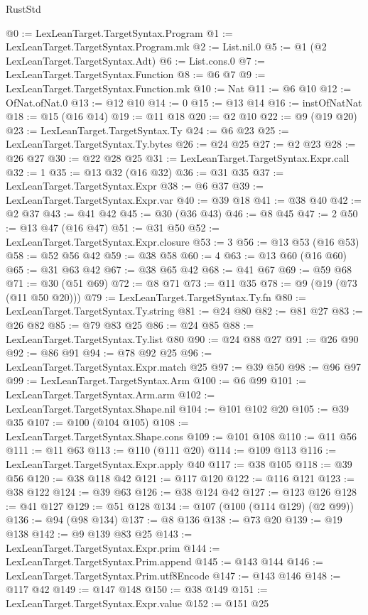 \begin{lexlean}{RustStd}
\begin{coremodule}
@0 := LexLeanTarget.TargetSyntax.Program
@1 := LexLeanTarget.TargetSyntax.Program.mk
@2 := List.nil.{0}
@5 := @1 (@2 LexLeanTarget.TargetSyntax.Adt)
@6 := List.cons.{0}
@7 := LexLeanTarget.TargetSyntax.Function
@8 := @6 @7
@9 := LexLeanTarget.TargetSyntax.Function.mk
@10 := Nat
@11 := @6 @10
@12 := OfNat.ofNat.{0}
@13 := @12 @10
@14 := 0
@15 := @13 @14
@16 := instOfNatNat
@18 := @15 (@16 @14)
@19 := @11 @18
@20 := @2 @10
@22 := @9 (@19 @20)
@23 := LexLeanTarget.TargetSyntax.Ty
@24 := @6 @23
@25 := LexLeanTarget.TargetSyntax.Ty.bytes
@26 := @24 @25
@27 := @2 @23
@28 := @26 @27
@30 := @22 @28 @25
@31 := LexLeanTarget.TargetSyntax.Expr.call
@32 := 1
@35 := @13 @32 (@16 @32)
@36 := @31 @35
@37 := LexLeanTarget.TargetSyntax.Expr
@38 := @6 @37
@39 := LexLeanTarget.TargetSyntax.Expr.var
@40 := @39 @18
@41 := @38 @40
@42 := @2 @37
@43 := @41 @42
@45 := @30 (@36 @43)
@46 := @8 @45
@47 := 2
@50 := @13 @47 (@16 @47)
@51 := @31 @50
@52 := LexLeanTarget.TargetSyntax.Expr.closure
@53 := 3
@56 := @13 @53 (@16 @53)
@58 := @52 @56 @42
@59 := @38 @58
@60 := 4
@63 := @13 @60 (@16 @60)
@65 := @31 @63 @42
@67 := @38 @65 @42
@68 := @41 @67
@69 := @59 @68
@71 := @30 (@51 @69)
@72 := @8 @71
@73 := @11 @35
@78 := @9 (@19 (@73 (@11 @50 @20)))
@79 := LexLeanTarget.TargetSyntax.Ty.fn
@80 := LexLeanTarget.TargetSyntax.Ty.string
@81 := @24 @80
@82 := @81 @27
@83 := @26 @82
@85 := @79 @83 @25
@86 := @24 @85
@88 := LexLeanTarget.TargetSyntax.Ty.list @80
@90 := @24 @88 @27
@91 := @26 @90
@92 := @86 @91
@94 := @78 @92 @25
@96 := LexLeanTarget.TargetSyntax.Expr.match @25
@97 := @39 @50
@98 := @96 @97
@99 := LexLeanTarget.TargetSyntax.Arm
@100 := @6 @99
@101 := LexLeanTarget.TargetSyntax.Arm.arm
@102 := LexLeanTarget.TargetSyntax.Shape.nil
@104 := @101 @102 @20
@105 := @39 @35
@107 := @100 (@104 @105)
@108 := LexLeanTarget.TargetSyntax.Shape.cons
@109 := @101 @108
@110 := @11 @56
@111 := @11 @63
@113 := @110 (@111 @20)
@114 := @109 @113
@116 := LexLeanTarget.TargetSyntax.Expr.apply @40
@117 := @38 @105
@118 := @39 @56
@120 := @38 @118 @42
@121 := @117 @120
@122 := @116 @121
@123 := @38 @122
@124 := @39 @63
@126 := @38 @124 @42
@127 := @123 @126
@128 := @41 @127
@129 := @51 @128
@134 := @107 (@100 (@114 @129) (@2 @99))
@136 := @94 (@98 @134)
@137 := @8 @136
@138 := @73 @20
@139 := @19 @138
@142 := @9 @139 @83 @25
@143 := LexLeanTarget.TargetSyntax.Expr.prim
@144 := LexLeanTarget.TargetSyntax.Prim.append
@145 := @143 @144
@146 := LexLeanTarget.TargetSyntax.Prim.utf8Encode
@147 := @143 @146
@148 := @117 @42
@149 := @147 @148
@150 := @38 @149
@151 := LexLeanTarget.TargetSyntax.Expr.value
@152 := @151 @25

\end{coremodule}
\end{lexlean}
